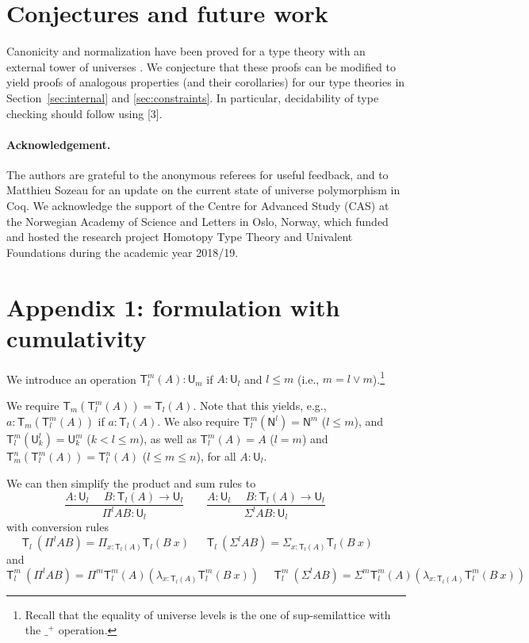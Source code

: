 \documentclass[a4paper,UKenglish,cleveref, autoref, thm-restate]{lipics-v2021}
\newcommand{\NN}{\mathsf{N}}
\newcommand{\UU}{\mathsf{U}}
\newcommand{\mylam}[3]{\lambda_{#1:#2}#3}
\newcommand{\mypi}[3]{\Pi_{#1:#2}#3}
\newcommand{\mysig}[3]{\Sigma_{#1:#2}#3}
\newcommand{\T}{\mathsf{T}}
\begin{document}
\section{Conjectures and future work}\label{sec:future}

Canonicity and normalization have been proved for a type theory with an external tower of universes \cite{coquand:tcs2019}. We conjecture that these proofs can be modified to yield proofs of analogous properties (and their corollaries) for our type theories in Section~\ref{sec:internal} and \ref{sec:constraints}.
%
In particular, decidability of type checking should follow using [3].

\paragraph{Acknowledgement.}
The authors are grateful to the anonymous referees for useful feedback,
and to Matthieu Sozeau for an update on the current state
of universe polymorphism in Coq.
We acknowledge the support of the Centre for Advanced Study (CAS)
at the Norwegian Academy of Science and Letters
in Oslo, Norway, which funded and hosted the research project Homotopy
Type Theory and Univalent Foundations during the academic year 2018/19.




\section*{Appendix 1: formulation with cumulativity}


We introduce an operation $\T_{l}^{m}(A):\UU_{m}$ if $A:\UU_{l}$
and $l\leqslant m$ (i.e., $m = l\vee m$).\footnote{%
Recall that the equality of universe levels is the one of
sup-semilattice with the $\_^+$ operation.}

We require $\T_{m}(\T_{l}^{m}(A)) = \T_{l}(A)$. Note that this
yields, e.g., $a:\T_{m}(\T_{l}^{m}(A))$ if $a:\T_{l}(A)$.
We also require $\T_{l}^{m}(\NN^{l}) = \NN^{m}$ ($l\leqslant m$),
and $\T_{l}^{m}(\UU_{k}^l) = \UU_{k}^{m}$ ($k<l\leqslant m$),
as well as $\T_{l}^m(A) = A$ ($l=m$)
and $\T_{m}^n(\T_{l}^m(A)) = \T_l^n(A)$ ($l\leqslant m\leqslant n$),
for all $A:\UU_l$.

We can then simplify the product and sum rules to
$$
\frac{A:\UU_{l}~~~~~~B:\T_{l}(A)\rightarrow \UU_{l}}
     {\Pi^{l} A B:\UU_{l}}~~~~~~~~~
\frac{A:\UU_{l}~~~~~~B:\T_{l}(A)\rightarrow \UU_{l}}
     {\Sigma^{l} A B:\UU_{l}}~~~~~~~~~
$$
with conversion rules
$$
\T_{l}~(\Pi^{l} A B) = \mypi{x}{\T_{l}(A)}{ \T_{l}(B~x)}~~~~~~~
\T_{l}~(\Sigma^{l} A B) =  \mysig{x}{\T_{l}(A)}{ \T_{l}(B~x)}~~~~~~~
$$
and
$$
\T_{l}^{m}~(\Pi^{l} A B) = \Pi^{m} \T_{l}^{m}(A) (\mylam {x}{\T_{l}(A)}{\T_{l}^{m}(B~x)})~~~~~~
\T_{l}^{m}~(\Sigma^{l} A B) = \Sigma^{m} \T_{l}^{m}(A) (\mylam {x}{\T_{l}(A)}{\T_{l}^{m}(B~x)})~~~~~~
$$
\end{document}

